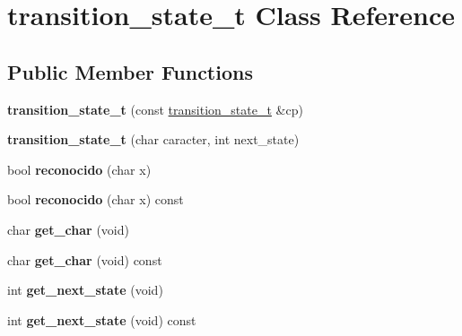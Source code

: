 \hypertarget{classtransition__state__t}{}\section{transition\+\_\+state\+\_\+t Class Reference}
\label{classtransition__state__t}
\subsection*{Public Member Functions}
\begin{DoxyCompactItemize}
\item 
\hypertarget{classtransition__state__t_aafa1333bdc16f0bc60206a35cd66e000}{}\label{classtransition__state__t_aafa1333bdc16f0bc60206a35cd66e000} 
{\bfseries transition\+\_\+state\+\_\+t} (const \hyperlink{classtransition__state__t}{transition\+\_\+state\+\_\+t} \&cp)
\item 
\hypertarget{classtransition__state__t_a3c2bae21e3a49b628de725750df753e5}{}\label{classtransition__state__t_a3c2bae21e3a49b628de725750df753e5} 
{\bfseries transition\+\_\+state\+\_\+t} (char caracter, int next\+\_\+state)
\item 
\hypertarget{classtransition__state__t_a1689b5709caea01cb123e9b500412a16}{}\label{classtransition__state__t_a1689b5709caea01cb123e9b500412a16} 
bool {\bfseries reconocido} (char x)
\item 
\hypertarget{classtransition__state__t_a127be6be2bea8eb2b823662a3f7db599}{}\label{classtransition__state__t_a127be6be2bea8eb2b823662a3f7db599} 
bool {\bfseries reconocido} (char x) const
\item 
\hypertarget{classtransition__state__t_ac56515147eb6cd844fba060e88230804}{}\label{classtransition__state__t_ac56515147eb6cd844fba060e88230804} 
char {\bfseries get\+\_\+char} (void)
\item 
\hypertarget{classtransition__state__t_a5a304b3543fcb760245ab8e971944061}{}\label{classtransition__state__t_a5a304b3543fcb760245ab8e971944061} 
char {\bfseries get\+\_\+char} (void) const
\item 
\hypertarget{classtransition__state__t_a6037d91ebf7e05473ef77bbffb86b803}{}\label{classtransition__state__t_a6037d91ebf7e05473ef77bbffb86b803} 
int {\bfseries get\+\_\+next\+\_\+state} (void)
\item 
\hypertarget{classtransition__state__t_a8a73555eba56b793463b621d4b8a6bf1}{}\label{classtransition__state__t_a8a73555eba56b793463b621d4b8a6bf1} 
int {\bfseries get\+\_\+next\+\_\+state} (void) const

\end{DoxyCompactItemize}
